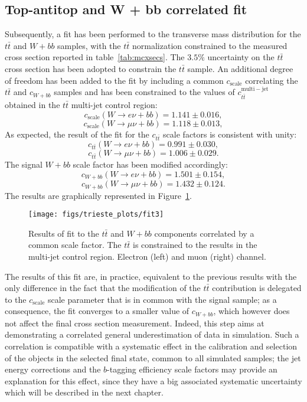 \subsection{Top-antitop and W + bb correlated fit}
Subsequently, a fit has been performed to the
transverse mass distribution for the $t\bar{t}$ and $W + bb$
samples, with the $t\bar{t}$ normalization constrained to the
measured cross section reported in table~\ref{tab:mcxsecs}.
The $3.5\%$ uncertainty on the $t\bar{t}$ cross section has been
adopted to constrain the $t\bar{t}$ sample.
An additional degree of freedom has been added to the fit by
including a common $c_{\mathrm{scale}}$ correlating the $t\bar{t}$ and
$c_{W+bb}$ samples and has been constrained to the
values of $c_{t\bar{t}}^{\mathrm{multi-jet}}$ obtained in the
$t\bar{t}$ multi-jet control region:
$$c_{\mathrm{scale}}(W \rightarrow e \nu + bb) = 1.141 \pm 0.016 \mathrm{,}$$
$$c_{\mathrm{scale}}(W \rightarrow \mu \nu + bb) = 1.118 \pm 0.013 \mathrm{,}$$
As expected, the result of the fit for the $c_{t\bar{t}}$
scale factors is consistent with unity:
$$c_{t\bar{t}}(W \rightarrow e \nu + bb) = 0.991 \pm 0.030 \mathrm{,}$$
$$c_{t\bar{t}}(W \rightarrow \mu \nu + bb) = 1.006 \pm 0.029 \mathrm{.}$$
The signal $W+bb$ scale factor has been modified accordingly:
$$c_{W+bb}(W \rightarrow e \nu + bb) = 1.501 \pm 0.154 \mathrm{,}$$
$$c_{W+bb}(W \rightarrow \mu \nu + bb) = 1.432 \pm 0.124 \mathrm{.}$$
The results are graphically represented in Figure~\ref{fig:intermediatefit2}.
\begin{figure}[htb]
        \begin{center}
                \leavevmode
                \texttt{[image: figs/trieste\_plots/fit3]}
        \end{center}
        \caption{Results of fit to the $t\bar{t}$ and $W+bb$ components correlated by
          a common scale factor. The $t\bar{t}$ is constrained to the results
          in the multi-jet control region. Electron (left) and
          muon (right) channel.}
        \label{fig:intermediatefit2}
\end{figure}
The results of this fit are, in practice, equivalent to the previous results
with the only difference in the fact that the modification of the $t\bar{t}$
contribution is delegated to the $c_{\mathrm{scale}}$ scale parameter that
is in common with the signal sample; as a consequence, the fit converges to a
smaller value of $c_{W+bb}$, which however does not affect the final cross section
measurement.
Indeed, this step aims at demonstrating a correlated general underestimation of data
in simulation. Such a correlation is compatible with a systematic effect in the calibration
and selection of the objects in the selected final state, common to all simulated
samples; the jet energy corrections and the $b$-tagging efficiency scale factors
may provide an explanation for this effect, since they have a big associated
systematic uncertainty which will be described in the next chapter.


